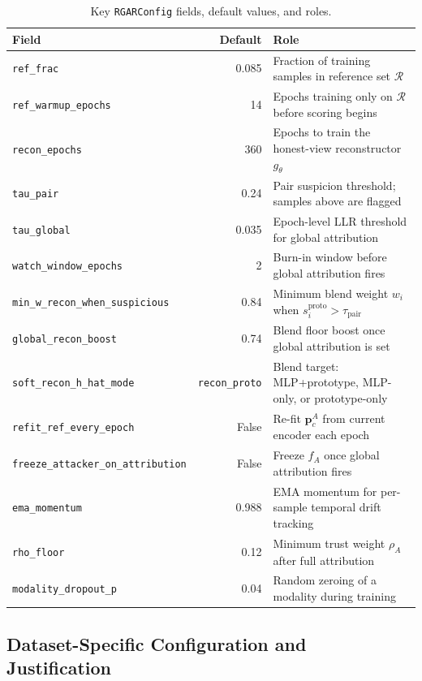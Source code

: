 \documentclass{article}
\begin{document}
\begin{table}[h]
\centering
\caption{Key \texttt{RGARConfig} fields, default values, and roles.}
\label{tab:rgar_defaults}
\small
\setlength{\tabcolsep}{3pt}
\begin{tabular}{l r p{7.5cm}}
\toprule
\textbf{Field} & \textbf{Default} & \textbf{Role} \\
\midrule
\texttt{ref\_frac}          & 0.085  & Fraction of training samples in reference set $\mathcal{R}$ \\
\texttt{ref\_warmup\_epochs}& 14     & Epochs training only on $\mathcal{R}$ before scoring begins \\
\texttt{recon\_epochs}      & 360    & Epochs to train the honest-view reconstructor $g_\theta$ \\
\texttt{tau\_pair}          & 0.24   & Pair suspicion threshold; samples above are flagged \\
\texttt{tau\_global}        & 0.035  & Epoch-level LLR threshold for global attribution \\
\texttt{watch\_window\_epochs} & 2   & Burn-in window before global attribution fires \\
\texttt{min\_w\_recon\_when\_suspicious} & 0.84 & Minimum blend weight $w_i$ when $s^{\text{proto}}_i > \tau_{\text{pair}}$ \\
\texttt{global\_recon\_boost} & 0.74 & Blend floor boost once global attribution is set \\
\texttt{soft\_recon\_h\_hat\_mode} & \texttt{recon\_proto} & Blend target: MLP+prototype, MLP-only, or prototype-only \\
\texttt{refit\_ref\_every\_epoch} & False & Re-fit $\mathbf{p}^A_c$ from current encoder each epoch \\
\texttt{freeze\_attacker\_on\_attribution} & False & Freeze $f_A$ once global attribution fires \\
\texttt{ema\_momentum}      & 0.988  & EMA momentum for per-sample temporal drift tracking \\
\texttt{rho\_floor}         & 0.12   & Minimum trust weight $\rho_A$ after full attribution \\
\texttt{modality\_dropout\_p} & 0.04 & Random zeroing of a modality during training \\
\bottomrule
\end{tabular}
\end{table}

\subsection{Dataset-Specific Configuration and Justification}
\end{document}
